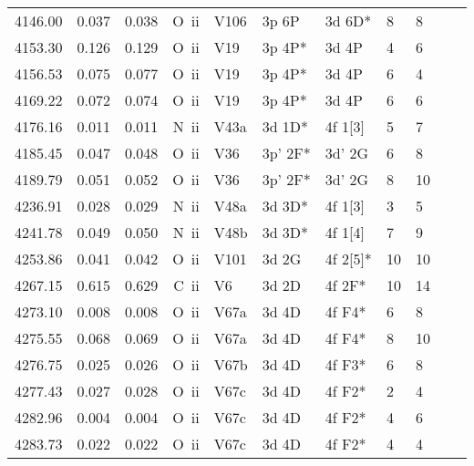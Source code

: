 \begin{longtable}{lrlrlllllll}
 4146.00 &   0.037 &   0.038 &  O~{\sc ii}      &  V106      &  3p 6P     &  3d 6D*    &          8 &        8    \\
 4153.30 &   0.126 &   0.129 &  O~{\sc ii}      &  V19       &  3p 4P*    &  3d 4P     &          4 &        6    \\
 4156.53 &   0.075 &   0.077 &  O~{\sc ii}      &  V19       &  3p 4P*    &  3d 4P     &          6 &        4    \\
 4169.22 &   0.072 &   0.074 &  O~{\sc ii}      &  V19       &  3p 4P*    &  3d 4P     &          6 &        6    \\
 4176.16 &   0.011 &   0.011 &  N~{\sc ii}      &  V43a      &  3d 1D*    &  4f 1[3]   &          5 &        7    \\
 4185.45 &   0.047 &   0.048 &  O~{\sc ii}      &  V36       &  3p' 2F*   &  3d' 2G    &          6 &        8    \\
 4189.79 &   0.051 &   0.052 &  O~{\sc ii}      &  V36       &  3p' 2F*   &  3d' 2G    &          8 &       10    \\
 4236.91 &   0.028 &   0.029 &  N~{\sc ii}      &  V48a      &  3d 3D*    &  4f 1[3]   &          3 &        5    \\
 4241.78 &   0.049 &   0.050 &  N~{\sc ii}      &  V48b      &  3d 3D*    &  4f 1[4]   &          7 &        9    \\
 4253.86 &   0.041 &   0.042 &  O~{\sc ii}      &  V101      &  3d 2G     &  4f 2[5]*  &         10 &       10    \\
 4267.15 &   0.615 &   0.629 &  C~{\sc ii}      &  V6        &  3d 2D     &  4f 2F*    &         10 &       14    \\
 4273.10 &   0.008 &   0.008 &  O~{\sc ii}      &  V67a      &  3d 4D     &  4f F4*    &          6 &        8    \\
 4275.55 &   0.068 &   0.069 &  O~{\sc ii}      &  V67a      &  3d 4D     &  4f F4*    &          8 &       10    \\
 4276.75 &   0.025 &   0.026 &  O~{\sc ii}      &  V67b      &  3d 4D     &  4f F3*    &          6 &        8    \\
 4277.43 &   0.027 &   0.028 &  O~{\sc ii}      &  V67c      &  3d 4D     &  4f F2*    &          2 &        4    \\
 4282.96 &   0.004 &   0.004 &  O~{\sc ii}      &  V67c      &  3d 4D     &  4f F2*    &          4 &        6    \\
 4283.73 &   0.022 &   0.022 &  O~{\sc ii}      &  V67c      &  3d 4D     &  4f F2*    &          4 &        4    \\

\end{longtable}

